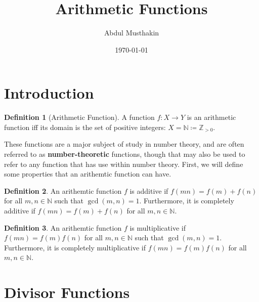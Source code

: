 \documentclass[a4paper]{article}
\title{Arithmetic Functions}
\author{Abdul Musthakin}
\date{\today}
\theoremstyle{definition}
\newtheorem{definition}{Definition}
\begin{document}
\maketitle

\section{Introduction}

\begin{definition}[Arithmetic Function]
    A function $f: X \to Y$ is an arithmetic function iff its domain is the set of positive integers: $X = \mathbb{N} \coloneq \mathbb{Z}_{>0}$.
\end{definition}
These functions are a major subject of study in number theory, and are often referred to as \textbf{number-theoretic} functions, though that may also be used to refer to any function that has use within number theory.
First, we will define some properties that an arithemtic function can have.
\begin{definition}
    An arithemtic function $f$ is additive if $f(mn) = f(m) + f(n)$ for all $m, n \in \mathbb{N}$ such that $\gcd(m,n)=1$.
    Furthermore, it is completely additive if $f(mn) = f(m) + f(n)$ for all $m, n \in \mathbb{N}$.
\end{definition}
\begin{definition}
    An arithemtic function $f$ is multiplicative if $f(mn) = f(m)f(n)$ for all $m, n \in \mathbb{N}$ such that $\gcd(m,n)=1$.
    Furthermore, it is completely multiplicative if $f(mn) = f(m)f(n)$ for all $m, n \in \mathbb{N}$.
\end{definition}

\section{Divisor Functions}
\end{document}

